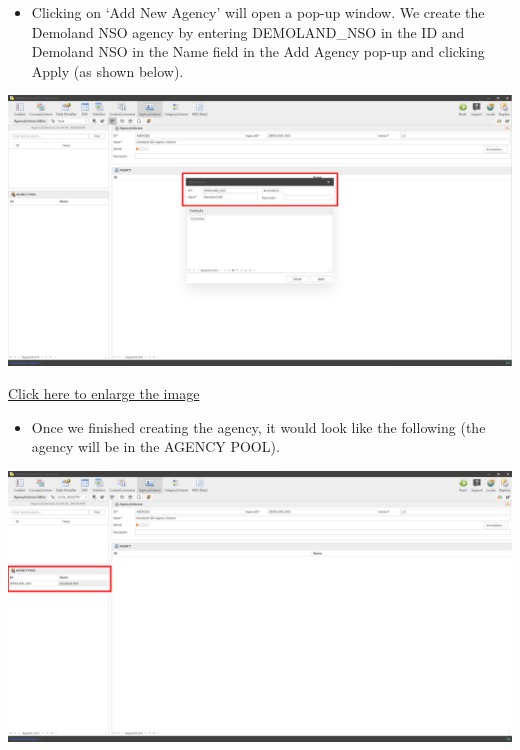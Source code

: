 \documentclass[
]{book}
\providecommand{\tightlist}{%
  \setlength{\itemsep}{0pt}\setlength{\parskip}{0pt}}
\begin{document}
\begin{itemize}
\tightlist
\item
  Clicking on `Add New Agency' will open a pop-up window. We create the Demoland NSO agency by entering DEMOLAND\_NSO in the ID and Demoland NSO in the Name field in the Add Agency pop-up and clicking Apply (as shown below).
\end{itemize}

\begin{center}\includegraphics[width=1\linewidth]{./images/image066} \end{center}

\href{images/image066.png}{Click here to enlarge the image}

\begin{itemize}
\tightlist
\item
  Once we finished creating the agency, it would look like the following (the agency will be in the AGENCY POOL).
\end{itemize}

\begin{center}\includegraphics[width=1\linewidth]{./images/image068} \end{center}
\end{document}

